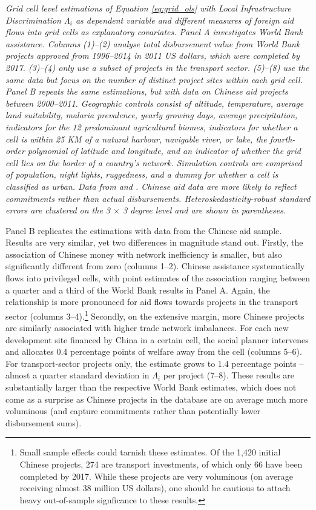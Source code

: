 \documentclass[11pt, oneside]{article}   	%
\newcommand{\mysubcaption}[1]{
\justify
\begin{spacing}{0.7}
\textit{\footnotesize #1}
\end{spacing}}
\begin{document}
\begin{table}[!t]
\mysubcaption{Grid cell level estimations of Equation \eqref{eq:grid_ols} with Local Infrastructure Discrimination $\Lambda_{i}$ as dependent variable and different measures of foreign aid flows into grid cells as explanatory covariates. Panel A investigates World Bank assistance. Columns (1)--(2) analyse total disbursement value from World Bank projects approved from 1996--2014 in 2011 US dollars, which were completed by 2017. (3)--(4) only use a subset of projects in the transport sector. (5)--(8) use the same data but focus on the number of distinct project sites within each grid cell. Panel B repeats the same estimations, but with data on Chinese aid projects between 2000--2011. Geographic controls consist of altitude, temperature, average land suitability, malaria prevalence, yearly growing days, average precipitation, indicators for the 12 predominant agricultural biomes, indicators for whether a cell is within 25 KM of a natural harbour, navigable river, or lake, the fourth-order polynomial of latitude and longitude, and an indicator of whether the grid cell lies on the border of a country's network. Simulation controls are comprised of population, night lights, ruggedness, and a dummy for whether a cell is classified as urban. Data from \cite{AidData_WorldBankGeocoded_2017} and \cite{Strange_TrackingUnderreportedFinancial_2017}. Chinese aid data are more likely to reflect commitments rather than actual disbursements. Heteroskedasticity-robust standard errors are clustered on the 3 $\times$ 3 degree level and are shown in parentheses.}
\end{table}

Panel B replicates the estimations with data from the Chinese aid sample. Results are very similar, yet two differences in magnitude stand out. Firstly, the association of Chinese money with network inefficiency is smaller, but also significantly different from zero (columns 1--2). Chinese assistance systematically flows into privileged cells, with point estimates of the association ranging between a quarter and a third of the World Bank results in Panel A. Again, the relationship is more pronounced for aid flows towards projects in the transport sector (columns 3--4).\footnote{Small sample effects could tarnish these estimates. Of the 1,420 initial Chinese projects, 274 are transport investments, of which only 66 have been completed by 2017. While these projects are very voluminous (on average receiving almost 38 million US dollars), one should be cautious to attach heavy out-of-sample signficance to these results.} Secondly, on the extensive margin, more Chinese projects are similarly associated with higher trade network imbalances. For each new development site financed by China in a certain cell, the social planner intervenes and allocates 0.4 percentage points of welfare away from the cell (columns 5--6). For transport-sector projects only, the estimate grows to 1.4 percentage points -- almost a quarter standard deviation in $\Lambda_{i}$ per project (7--8). These results are substantially larger than the respective World Bank estimates, which does not come as a surprise as Chinese projects in the database are on average much more voluminous (and capture commitments rather than potentially lower disbursement sums).
\end{document}
